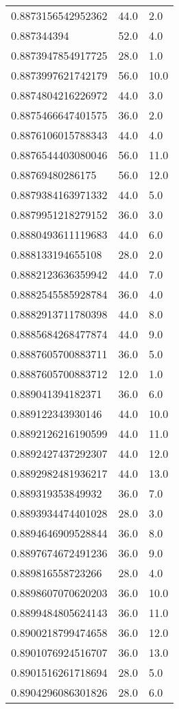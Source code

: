 \begin{center}
\begin{supertabular}[H]{p{0.30\textwidth}p{0.05\textwidth}p{0.05\textwidth}}
0.8873156542952362 & 44.0 & 2.0 \\ 
0.887344394 & 52.0 & 4.0 \\ 
0.8873947854917725 & 28.0 & 1.0 \\ 
0.8873997621742179 & 56.0 & 10.0 \\ 
0.8874804216226972 & 44.0 & 3.0 \\ 
0.8875466647401575 & 36.0 & 2.0 \\ 
0.8876106015788343 & 44.0 & 4.0 \\ 
0.8876544403080046 & 56.0 & 11.0 \\ 
0.88769480286175 & 56.0 & 12.0 \\ 
0.8879384163971332 & 44.0 & 5.0 \\ 
0.8879951218279152 & 36.0 & 3.0 \\ 
0.8880493611119683 & 44.0 & 6.0 \\ 
0.888133194655108 & 28.0 & 2.0 \\ 
0.8882123636359942 & 44.0 & 7.0 \\ 
0.8882545585928784 & 36.0 & 4.0 \\ 
0.8882913711780398 & 44.0 & 8.0 \\ 
0.8885684268477874 & 44.0 & 9.0 \\ 
0.8887605700883711 & 36.0 & 5.0 \\ 
0.8887605700883712 & 12.0 & 1.0 \\ 
0.889041394182371 & 36.0 & 6.0 \\ 
0.889122343930146 & 44.0 & 10.0 \\ 
0.8892126216190599 & 44.0 & 11.0 \\ 
0.8892427437292307 & 44.0 & 12.0 \\ 
0.8892982481936217 & 44.0 & 13.0 \\ 
0.889319353849932 & 36.0 & 7.0 \\ 
0.8893934474401028 & 28.0 & 3.0 \\ 
0.8894646909528844 & 36.0 & 8.0 \\ 
0.8897674672491236 & 36.0 & 9.0 \\ 
0.889816558723266 & 28.0 & 4.0 \\ 
0.8898607070620203 & 36.0 & 10.0 \\ 
0.8899484805624143 & 36.0 & 11.0 \\ 
0.8900218799474658 & 36.0 & 12.0 \\ 
0.8901076924516707 & 36.0 & 13.0 \\ 
0.8901516261718694 & 28.0 & 5.0 \\ 
0.8904296086301826 & 28.0 & 6.0 \\ 

\end{supertabular}
\end{center}
